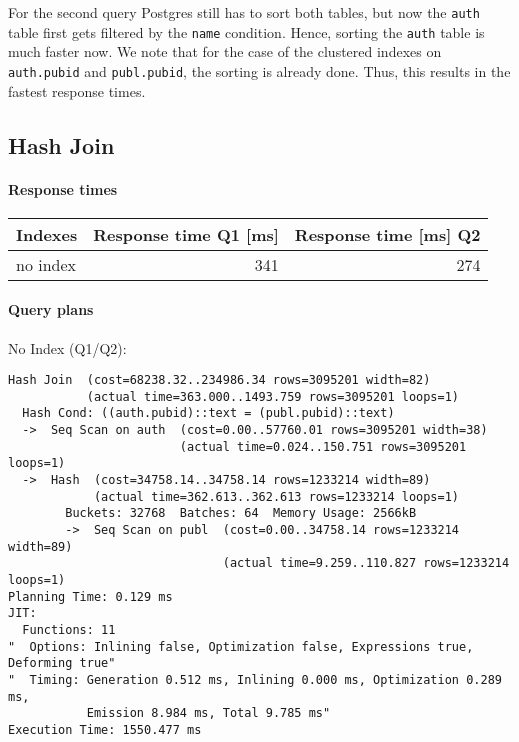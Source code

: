 \documentclass[11pt]{scrartcl}
\begin{document}
For the second query Postgres still has to sort both tables, but now the \texttt{auth} table first gets filtered
by the \texttt{name} condition.
Hence, sorting the \texttt{auth} table is much faster now.
We note that for the case of the clustered indexes on \texttt{auth.pubid} and \texttt{publ.pubid}, the sorting is already
done.
Thus, this results in the fastest response times.

\subsection*{Hash Join}

\paragraph{Response times}\mbox{}

\begin{table}[H]
  \centering
  \begin{tabular}{l|r|r}
    Indexes & Response time Q1 [ms] & Response time [ms] Q2 \tabularnewline
    \hline
    no index & 341 & 274 \tabularnewline
  \end{tabular}
\end{table}

\paragraph{Query plans}\mbox{}

No Index (Q1/Q2):

{\small
\parskip0pt\begin{verbatim}
Hash Join  (cost=68238.32..234986.34 rows=3095201 width=82)
           (actual time=363.000..1493.759 rows=3095201 loops=1)
  Hash Cond: ((auth.pubid)::text = (publ.pubid)::text)
  ->  Seq Scan on auth  (cost=0.00..57760.01 rows=3095201 width=38)
                        (actual time=0.024..150.751 rows=3095201 loops=1)
  ->  Hash  (cost=34758.14..34758.14 rows=1233214 width=89)
            (actual time=362.613..362.613 rows=1233214 loops=1)
        Buckets: 32768  Batches: 64  Memory Usage: 2566kB
        ->  Seq Scan on publ  (cost=0.00..34758.14 rows=1233214 width=89)
                              (actual time=9.259..110.827 rows=1233214 loops=1)
Planning Time: 0.129 ms
JIT:
  Functions: 11
"  Options: Inlining false, Optimization false, Expressions true, Deforming true"
"  Timing: Generation 0.512 ms, Inlining 0.000 ms, Optimization 0.289 ms,
           Emission 8.984 ms, Total 9.785 ms"
Execution Time: 1550.477 ms
\end{verbatim}}
\end{document}
